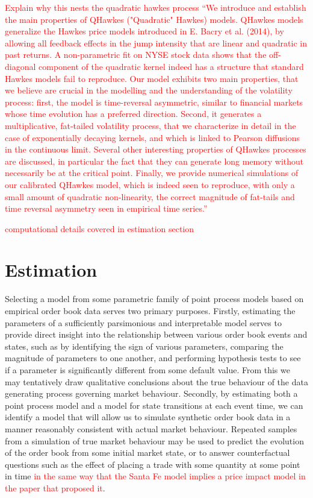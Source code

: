 \documentclass[honours,12pt]{unswthesis}
\numberwithin{equation}{section}
\begin{document}
\textcolor{red}{Explain why this nests the quadratic hawkes process}
\textcolor{red}{``We introduce and establish the main properties of QHawkes ("Quadratic" Hawkes) models. QHawkes models generalize the Hawkes price models introduced in E. Bacry et al. (2014), by allowing all feedback effects in the jump intensity that are linear and quadratic in past returns. A non-parametric fit on NYSE stock data shows that the off-diagonal component of the quadratic kernel indeed has a structure that standard Hawkes models fail to reproduce. Our model exhibits two main properties, that we believe are crucial in the modelling and the understanding of the volatility process: first, the model is time-reversal asymmetric, similar to financial markets whose time evolution has a preferred direction. Second, it generates a multiplicative, fat-tailed volatility process, that we characterize in detail in the case of exponentially decaying kernels, and which is linked to Pearson diffusions in the continuous limit. Several other interesting properties of QHawkes processes are discussed, in particular the fact that they can generate long memory without necessarily be at the critical point. Finally, we provide numerical simulations of our calibrated QHawkes model, which is indeed seen to reproduce, with only a small amount of quadratic non-linearity, the correct magnitude of fat-tails and time reversal asymmetry seen in empirical time series.''}

\textcolor{red}{computational details covered in estimation section}


\chapter{Estimation}%
Selecting a model from some parametric family of point process models based on empirical order book data serves two primary purposes. Firstly, estimating the parameters of a sufficiently parsimonious and interpretable model serves to provide direct insight into the relationship between various order book events and states, such as by identifying the sign of various parameters, comparing the magnitude of parameters to one another, and performing hypothesis tests to see if a parameter is significantly different from some default value. From this we may tentatively draw qualitative conclusions about the true behaviour of the data generating process governing market behaviour. Secondly, by estimating both a point process model and a model for state transitions at each event time, we can identify a model that will allow us to simulate synthetic order book data in a manner reasonably consistent with actual market behaviour. Repeated samples from a simulation of true market behaviour may be used to predict the evolution of the order book from some initial market state, or to answer counterfactual questions such as the effect of placing a trade with some quantity at some point in time \textcolor{red}{in the same way that the Santa Fe model implies a price impact model in the paper that proposed it}.
\end{document}
